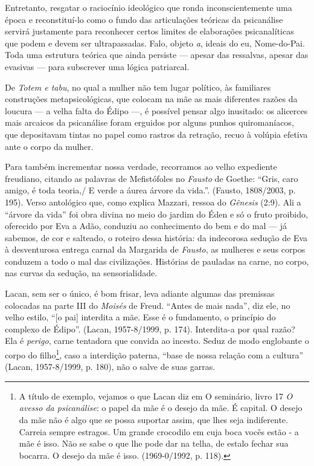 Entretanto, resgatar o raciocínio ideológico que ronda inconscientemente
uma época e reconstituí-lo como o fundo das articulações teóricas da
psicanálise servirá justamente para reconhecer certos limites de
elaborações psicanalíticas que podem e devem ser ultrapassadas. Falo,
objeto \emph{a}, ideais do eu, Nome-do-Pai. Toda uma estrutura teórica
que ainda persiste --- apesar das ressalvas, apesar das evasivas --- para
subscrever uma lógica patriarcal.

De \emph{Totem e tabu}, no qual a mulher não tem lugar político, às
familiares construções metapsicológicas, que colocam na mãe as mais
diferentes razões da loucura --- a velha falta do Édipo ---, é possível
pensar algo inusitado: os alicerces mais arcaicos da psicanálise foram
erguidos por alguns punhos quiromaníacos, que depositavam tintas no
papel como rastros da retração, recuo à volúpia efetiva ante o corpo da
mulher.

Para também incrementar nossa verdade, recorramos ao velho expediente
freudiano, citando as palavras de Mefistófoles no \emph{Fausto} de
Goethe: ``Gris, caro amigo, é toda teoria,/ E verde a áurea árvore da
vida.''. (Fausto, 1808/2003, p. 195). Verso antológico que, como explica
Mazzari, ressoa do \emph{Gênesis} (2:9). Ali a ``árvore da vida'' foi
obra divina no meio do jardim do Éden e só o fruto proibido, oferecido
por Eva a Adão, conduziu ao conhecimento do bem e do mal --- já sabemos,
de cor e salteado, o roteiro dessa história: da indecorosa sedução de
Eva à desventurosa entrega carnal da Margarida de \emph{Fausto}, as
mulheres e seus corpos conduzem a todo o mal das civilizações. Histórias
de pauladas na carne, no corpo, nas curvas da sedução, na
sensorialidade.

Lacan, sem ser o único, é bom frisar, leva adiante algumas das premissas
colocadas na parte III do \emph{Moisés} de Freud. ``Antes de mais
nada'', diz ele, no velho estilo, ``{[}o pai{]} interdita a mãe. Esse é
o fundamento, o princípio do complexo de Édipo''. (Lacan, 1957-8/1999,
p. 174). Interdita-a por qual razão? Ela é \emph{perigo}, carne
tentadora que convida ao incesto. Seduz de modo englobante o corpo do
filho\footnote{A título de exemplo, vejamos o que Lacan diz em O
  seminário, livro 17 \emph{O avesso da psicanálise}: o papel da mãe é o
  desejo da mãe. É capital. O desejo da mãe não é algo que se possa
  suportar assim, que lhes seja indiferente. Carreia sempre estragos. Um
  grande crocodilo em cuja boca vocês estão - a mãe é isso. Não se sabe
  o que lhe pode dar na telha, de estalo fechar sua bocarra. O desejo da
  mãe é isso. (1969-0/1992, p. 118).}, caso a interdição paterna, ``base
de nossa relação com a cultura'' (Lacan, 1957-8/1999, p. 180), não o
salve de suas garras.

